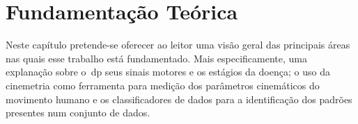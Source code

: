 \chapter{Fundamentação Teórica}\label{chapter:fundamentacao}
Neste capítulo pretende-se oferecer ao leitor uma visão geral das principais áreas nas quais esse trabalho está fundamentado. Mais especificamente, uma explanação sobre o~\ac{dp} seus sinais motores e os estágios da doença; o uso da cinemetria como ferramenta para medição dos parâmetros cinemáticos do movimento humano e os classificadores de dados para a identificação dos padrões presentes num conjunto de dados.






